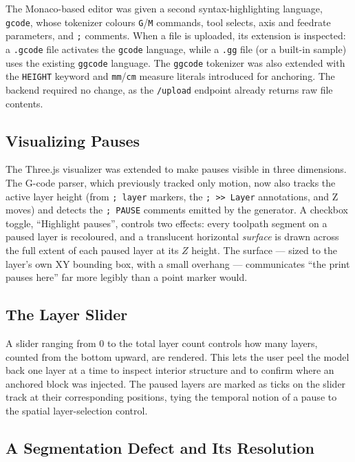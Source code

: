 The Monaco-based editor was given a second syntax-highlighting language, \texttt{gcode}, whose tokenizer colours \texttt{G}/\texttt{M} commands, tool selects, axis and feedrate parameters, and \texttt{;} comments. When a file is uploaded, its extension is inspected: a \texttt{.gcode} file activates the \texttt{gcode} language, while a \texttt{.gg} file (or a built-in sample) uses the existing \texttt{ggcode} language. The \texttt{ggcode} tokenizer was also extended with the \texttt{HEIGHT} keyword and \texttt{mm}/\texttt{cm} measure literals introduced for anchoring. The backend required no change, as the \texttt{/upload} endpoint already returns raw file contents.

\subsection*{Visualizing Pauses}

The Three.js visualizer was extended to make pauses visible in three dimensions. The G-code parser, which previously tracked only motion, now also tracks the active layer height (from \verb|; layer| markers, the \verb|; >> Layer| annotations, and Z moves) and detects the \verb|; PAUSE| comments emitted by the generator. A checkbox toggle, ``Highlight pauses'', controls two effects: every toolpath segment on a paused layer is recoloured, and a translucent horizontal \emph{surface} is drawn across the full extent of each paused layer at its $Z$ height. The surface --- sized to the layer's own XY bounding box, with a small overhang --- communicates ``the print pauses here'' far more legibly than a point marker would.

\subsection*{The Layer Slider}

A slider ranging from $0$ to the total layer count controls how many layers, counted from the bottom upward, are rendered. This lets the user peel the model back one layer at a time to inspect interior structure and to confirm where an anchored block was injected. The paused layers are marked as ticks on the slider track at their corresponding positions, tying the temporal notion of a pause to the spatial layer-selection control.

\subsection*{A Segmentation Defect and Its Resolution}

